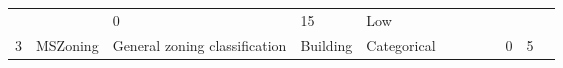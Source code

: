 \documentclass[11pt]{article}
\begin{document}
\begin{longtable}[]{@{}llllllllllll@{}}
\begin{minipage}[t]{0.04\columnwidth}
\strut
\end{minipage} & \begin{minipage}[t]{0.04\columnwidth}\raggedright\strut
\strut
\end{minipage} & \begin{minipage}[t]{0.04\columnwidth}\raggedright\strut
0\strut
\end{minipage} & \begin{minipage}[t]{0.04\columnwidth}\raggedright\strut
15\strut
\end{minipage} & \begin{minipage}[t]{0.04\columnwidth}\raggedright\strut
Low\strut
\end{minipage}\tabularnewline
\begin{minipage}[t]{0.04\columnwidth}\raggedright\strut
3\strut
\end{minipage} & \begin{minipage}[t]{0.04\columnwidth}\raggedright\strut
MSZoning\strut
\end{minipage} & \begin{minipage}[t]{0.04\columnwidth}\raggedright\strut
General zoning classification\strut
\end{minipage} & \begin{minipage}[t]{0.04\columnwidth}\raggedright\strut
Building\strut
\end{minipage} & \begin{minipage}[t]{0.04\columnwidth}\raggedright\strut
Categorical\strut
\end{minipage} & \begin{minipage}[t]{0.04\columnwidth}\raggedright\strut
\strut
\end{minipage} & \begin{minipage}[t]{0.04\columnwidth}\raggedright\strut
\strut
\end{minipage} & \begin{minipage}[t]{0.04\columnwidth}\raggedright\strut
\strut
\end{minipage} & \begin{minipage}[t]{0.04\columnwidth}\raggedright\strut
\strut
\end{minipage} & \begin{minipage}[t]{0.04\columnwidth}\raggedright\strut
0\strut
\end{minipage} & \begin{minipage}[t]{0.04\columnwidth}\raggedright\strut
5\strut
\end{minipage} & \begin{minipage}[t]{0.04\columnwidth}\raggedright\strut

\end{minipage}
\end{longtable}
\end{document}
